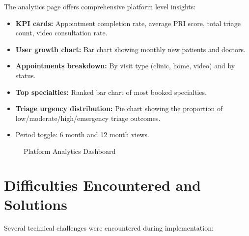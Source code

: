 \documentclass[12pt,a4paper,oneside]{report}
\begin{document}
The analytics page offers comprehensive platform level insights:

\begin{itemize}
    \item \textbf{KPI cards:} Appointment completion rate, average PRI score, total triage count, video consultation rate.
    \item \textbf{User growth chart:} Bar chart showing monthly new patients and doctors.
    \item \textbf{Appointments breakdown:} By visit type (clinic, home, video) and by status.
    \item \textbf{Top specialties:} Ranked bar chart of most booked specialties.
    \item \textbf{Triage urgency distribution:} Pie chart showing the proportion of low/moderate/high/emergency triage outcomes.
    \item Period toggle: 6 month and 12 month views.
\end{itemize}

\begin{figure}[H]
    \centering
    \caption{Platform Analytics Dashboard}
    \label{fig:screen admin analytics}
\end{figure}

\section{Difficulties Encountered and Solutions}

Several technical challenges were encountered during implementation:
\end{document}
